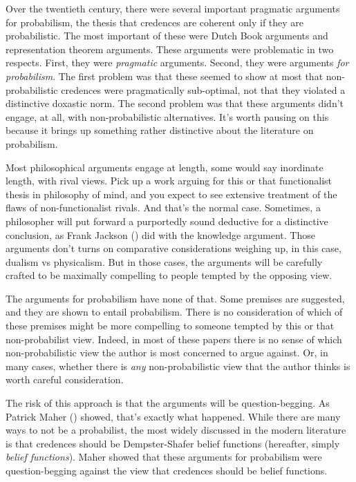 \documentclass[
  11pt,
  letterpaper,
  DIV=11,
  numbers=noendperiod,
  twoside]{scrartcl}
\begin{document}
Over the twentieth century, there were several important pragmatic
arguments for probabilism, the thesis that credences are coherent only
if they are probabilistic. The most important of these were Dutch Book
arguments and representation theorem arguments. These arguments were
problematic in two respects. First, they were \emph{pragmatic}
arguments. Second, they were arguments \emph{for probabilism}. The first
problem was that these seemed to show at most that non-probabilistic
credences were pragmatically sub-optimal, not that they violated a
distinctive doxastic norm. The second problem was that these arguments
didn't engage, at all, with non-probabilistic alternatives. It's worth
pausing on this because it brings up something rather distinctive about
the literature on probabilism.

Most philosophical arguments engage at length, some would say inordinate
length, with rival views. Pick up a work arguing for this or that
functionalist thesis in philosophy of mind, and you expect to see
extensive treatment of the flaws of non-functionalist rivals. And that's
the normal case. Sometimes, a philosopher will put forward a purportedly
sound deductive for a distinctive conclusion, as Frank Jackson
() did with the knowledge argument.
Those arguments don't turns on comparative considerations weighing up,
in this case, dualism vs physicalism. But in those cases, the arguments
will be carefully crafted to be maximally compelling to people tempted
by the opposing view.

The arguments for probabilism have none of that. Some premises are
suggested, and they are shown to entail probabilism. There is no
consideration of which of these premises might be more compelling to
someone tempted by this or that non-probabilist view. Indeed, in most of
these papers there is no sense of which non-probabilistic view the
author is most concerned to argue against. Or, in many cases, whether
there is \emph{any} non-probabilistic view that the author thinks is
worth careful consideration.

The risk of this approach is that the arguments will be
question-begging. As Patrick Maher ()
showed, that's exactly what happened. While there are many ways to not
be a probabilist, the most widely discussed in the modern literature is
that credences should be Dempster-Shafer belief functions (hereafter,
simply \emph{belief functions}). Maher showed that these arguments for
probabilism were question-begging against the view that credences should
be belief functions.
\end{document}
